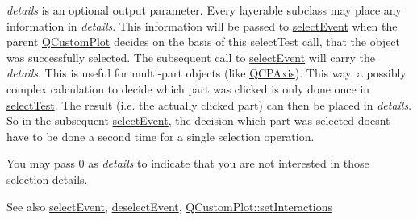 {\itshape details} is an optional output parameter. Every layerable subclass may place any information in {\itshape details}. This information will be passed to \hyperlink{class_q_c_p_layerable_a7498c2d0d081cf7cad0fb3bb93aa0e91}{select\+Event} when the parent \hyperlink{class_q_custom_plot}{Q\+Custom\+Plot} decides on the basis of this select\+Test call, that the object was successfully selected. The subsequent call to \hyperlink{class_q_c_p_layerable_a7498c2d0d081cf7cad0fb3bb93aa0e91}{select\+Event} will carry the {\itshape details}. This is useful for multi-\/part objects (like \hyperlink{class_q_c_p_axis}{Q\+C\+P\+Axis}). This way, a possibly complex calculation to decide which part was clicked is only done once in \hyperlink{class_q_c_p_layerable_a4001c4d0dfec55598efa4d531f2179a9}{select\+Test}. The result (i.\+e. the actually clicked part) can then be placed in {\itshape details}. So in the subsequent \hyperlink{class_q_c_p_layerable_a7498c2d0d081cf7cad0fb3bb93aa0e91}{select\+Event}, the decision which part was selected doesn\textquotesingle{}t have to be done a second time for a single selection operation.

You may pass 0 as {\itshape details} to indicate that you are not interested in those selection details.

\begin{DoxySeeAlso}{See also}
\hyperlink{class_q_c_p_layerable_a7498c2d0d081cf7cad0fb3bb93aa0e91}{select\+Event}, \hyperlink{class_q_c_p_layerable_ae546370644a5551c76af739afc008bee}{deselect\+Event}, \hyperlink{class_q_custom_plot_a5ee1e2f6ae27419deca53e75907c27e5}{Q\+Custom\+Plot\+::set\+Interactions} 
\end{DoxySeeAlso}


